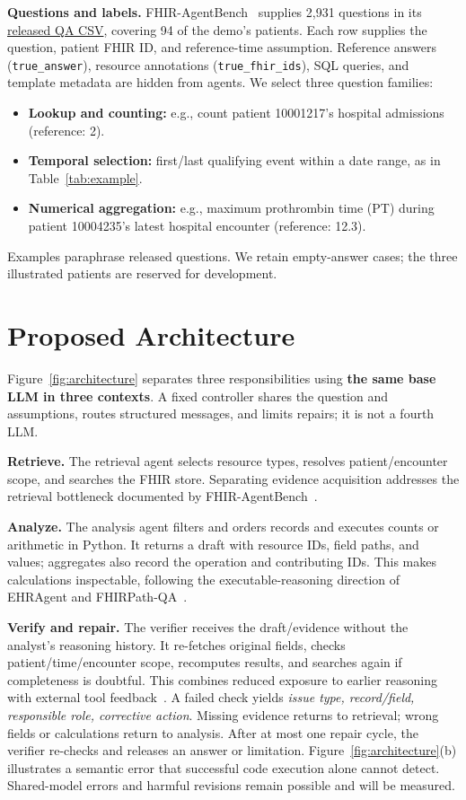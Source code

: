 \documentclass[sigconf,nonacm]{acmart}
\begin{document}
\textbf{Questions and labels.} FHIR-AgentBench~\cite{lee2026} supplies 2,931 questions in its \href{https://github.com/glee4810/FHIR-AgentBench/blob/master/final_dataset/questions_answers_sql_fhir.csv}{released QA CSV}, covering 94 of the demo's patients. Each row supplies the question, patient FHIR ID, and reference-time assumption. Reference answers (\texttt{true\_answer}), resource annotations (\texttt{true\_fhir\_ids}), SQL queries, and template metadata are hidden from agents. We select three question families:
\begin{itemize}
  \item \textbf{Lookup and counting:} e.g., count patient 10001217's hospital admissions (reference: 2).
  \item \textbf{Temporal selection:} first/last qualifying event within a date range, as in Table~\ref{tab:example}.
  \item \textbf{Numerical aggregation:} e.g., maximum prothrombin time (PT) during patient 10004235's latest hospital encounter (reference: 12.3).
\end{itemize}
Examples paraphrase released questions. We retain empty-answer cases; the three illustrated patients are reserved for development.

\section{Proposed Architecture}
Figure~\ref{fig:architecture} separates three responsibilities using \textbf{the same base LLM in three contexts}. A fixed controller shares the question and assumptions, routes structured messages, and limits repairs; it is not a fourth LLM.

\textbf{Retrieve.} The retrieval agent selects resource types, resolves patient/encounter scope, and searches the FHIR store. Separating evidence acquisition addresses the retrieval bottleneck documented by FHIR-AgentBench~\cite{lee2026}.

\textbf{Analyze.} The analysis agent filters and orders records and executes counts or arithmetic in Python. It returns a draft with resource IDs, field paths, and values; aggregates also record the operation and contributing IDs. This makes calculations inspectable, following the executable-reasoning direction of EHRAgent and FHIRPath-QA~\cite{shi2024,frew2026}.

\textbf{Verify and repair.} The verifier receives the draft/evidence without the analyst's reasoning history. It re-fetches original fields, checks patient/time/encounter scope, recomputes results, and searches again if completeness is doubtful. This combines reduced exposure to earlier reasoning~\cite{dhuliawala2024} with external tool feedback~\cite{gou2024}. A failed check yields \emph{issue type, record/field, responsible role, corrective action}. Missing evidence returns to retrieval; wrong fields or calculations return to analysis. After at most one repair cycle, the verifier re-checks and releases an answer or limitation. Figure~\ref{fig:architecture}(b) illustrates a semantic error that successful code execution alone cannot detect. Shared-model errors and harmful revisions remain possible and will be measured.
\end{document}
